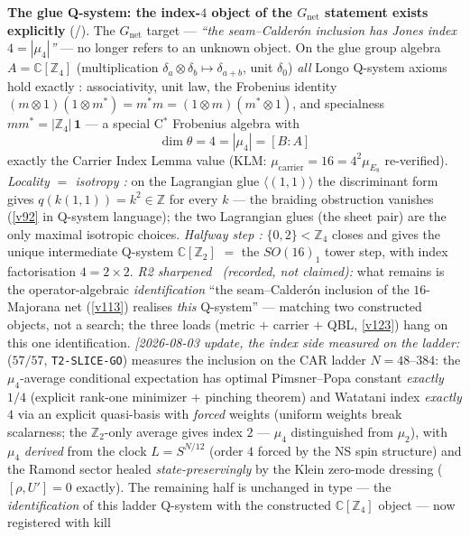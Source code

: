 \documentclass[11pt,a4paper]{article}
\newcommand{\Z}{\mathbb Z}
\begin{document}
\par\smallskip\noindent\textbf{The glue Q-system: the index-$4$ object of the $G_{\mathrm{net}}$ statement exists explicitly} (\mE/\mC).
The $G_{\mathrm{net}}$ target --- \emph{``the seam--Calder\'on inclusion has Jones index $4=|\mu_4|$''}
--- no longer refers to an unknown object. On the glue group algebra $A=\mathbb C[\Z_4]$ (multiplication
$\delta_a\otimes\delta_b\mapsto\delta_{a+b}$, unit $\delta_0$) \emph{all} Longo Q-system axioms hold
exactly \mE: associativity, unit law, the Frobenius identity
$(m\otimes1)(1\otimes m^*)=m^*m=(1\otimes m)(m^*\otimes1)$, and specialness $mm^*=|\Z_4|\,\mathbf1$ ---
a special C$^*$ Frobenius algebra with
\[
  \boxed{\ \dim\theta=4=|\mu_4|=[B:A]\ }
\]
exactly the Carrier Index Lemma value (KLM: $\mu_{\mathrm{carrier}}=16=4^2\mu_{E_8}$ re-verified).
\emph{Locality $=$ isotropy \mE:} on the Lagrangian glue $\langle(1,1)\rangle$ the discriminant form
gives $q(k(1,1))=k^2\in\Z$ for every $k$ --- the braiding obstruction vanishes (\vref{v92} in Q-system
language); the two Lagrangian glues (the sheet pair) are the only maximal isotropic choices.
\emph{Halfway step \mE:} $\{0,2\}<\Z_4$ closes and gives the unique intermediate Q-system
$\mathbb C[\Z_2]$ $=$ the $SO(16)_1$ tower step, with index factorisation $4=2\times2$. \emph{R2 sharpened
\mC\ (recorded, not claimed):} what remains is the operator-algebraic \emph{identification} ``the
seam--Calder\'on inclusion of the $16$-Majorana net (\vref{v113}) realises \emph{this} Q-system'' --- matching
two constructed objects, not a search; the three loads (metric $+$ carrier $+$ QBL, \vref{v123}) hang on this
one identification.
\emph{[2026-08-03 update, the index side measured on the ladder:}
 ($57/57$,
\texttt{T2-SLICE-GO}) measures the inclusion on the CAR ladder
$N=48$--$384$: the $\mu_4$-average conditional expectation has
optimal Pimsner--Popa constant \emph{exactly} $1/4$ (explicit
rank-one minimizer $+$ pinching theorem) and Watatani index
\emph{exactly} $4$ via an explicit quasi-basis with \emph{forced}
weights (uniform weights break scalarness; the $\Z_2$-only average
gives index $2$ --- $\mu_4$ distinguished from $\mu_2$), with
$\mu_4$ \emph{derived} from the clock $L=S^{N/12}$ (order $4$
forced by the NS spin structure) and the Ramond sector healed
\emph{state-preservingly} by the Klein zero-mode dressing
($[\rho,U']=0$ exactly).  The remaining half is unchanged in type
--- the \emph{identification} of this ladder Q-system with the
constructed $\mathbb C[\Z_4]$ object --- now registered with kill
\end{document}
